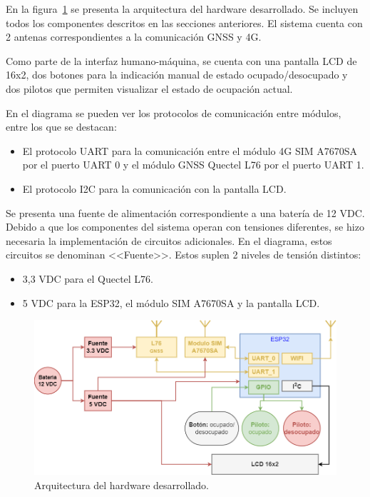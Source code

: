 En la figura~\ref{fig:Arq_harware} se presenta la arquitectura del hardware desarrollado. Se incluyen todos los componentes descritos en las secciones anteriores. El sistema cuenta con 2 antenas correspondientes a la comunicación GNSS y 4G. 

Como parte de la interfaz humano-máquina, se cuenta con una pantalla LCD de 16x2, dos botones para la indicación manual de estado ocupado/desocupado y dos pilotos que permiten visualizar el estado de ocupación actual. 

En el diagrama se pueden ver los protocolos de comunicación entre módulos, entre los que se destacan:

\begin{itemize}
    \item El protocolo UART para la comunicación entre el módulo 4G SIM A7670SA por el puerto UART 0 y el módulo  GNSS Quectel L76 por el puerto UART 1. 
    \item El protocolo I2C para la comunicación con la pantalla LCD. 
\end{itemize}

Se presenta una fuente de alimentación correspondiente a una batería de 12 VDC. Debido a que los componentes del sistema operan con tensiones diferentes, se hizo necesaria la implementación de circuitos adicionales. En el diagrama, estos circuitos se denominan <<Fuente>>. Estos suplen 2 niveles de tensión distintos: 

\begin{itemize}
    \item 3,3 VDC para el Quectel L76.
    \item 5 VDC para la ESP32, el módulo SIM A7670SA y la pantalla LCD.
\end{itemize}

\begin{figure}[htbp]
	\centering
	\includegraphics[width=1\textwidth]{./Figures/arquitectura_hardware_sistema.png}
	\caption{Arquitectura del hardware desarrollado.}
	\label{fig:Arq_harware}
\end{figure}



